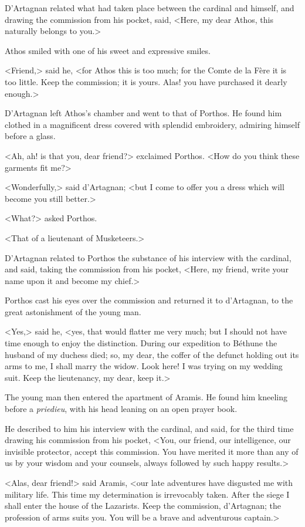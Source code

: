 D'Artagnan related what had taken place between the cardinal and himself, and drawing the commission from his pocket, said, <Here, my dear Athos, this naturally belongs to you.> 

Athos smiled with one of his sweet and expressive smiles. 

<Friend,> said he, <for Athos this is too much; for the Comte de la Fère it is too little. Keep the commission; it is yours. Alas! you have purchased it dearly enough.> 

D'Artagnan left Athos's chamber and went to that of Porthos. He found him clothed in a magnificent dress covered with splendid embroidery, admiring himself before a glass. 

<Ah, ah! is that you, dear friend?> exclaimed Porthos. <How do you think these garments fit me?> 

<Wonderfully,> said d'Artagnan; <but I come to offer you a dress which will become you still better.> 

<What?> asked Porthos. 

<That of a lieutenant of Musketeers.> 

D'Artagnan related to Porthos the substance of his interview with the cardinal, and said, taking the commission from his pocket, <Here, my friend, write your name upon it and become my chief.> 

Porthos cast his eyes over the commission and returned it to d'Artagnan, to the great astonishment of the young man. 

<Yes,> said he, <yes, that would flatter me very much; but I should not have time enough to enjoy the distinction. During our expedition to Béthune the husband of my duchess died; so, my dear, the coffer of the defunct holding out its arms to me, I shall marry the widow. Look here! I was trying on my wedding suit. Keep the lieutenancy, my dear, keep it.> 

The young man then entered the apartment of Aramis. He found him kneeling before a \textit{priedieu}, with his head leaning on an open prayer book. 

He described to him his interview with the cardinal, and said, for the third time drawing his commission from his pocket, <You, our friend, our intelligence, our invisible protector, accept this commission. You have merited it more than any of us by your wisdom and your counsels, always followed by such happy results.> 

<Alas, dear friend!> said Aramis, <our late adventures have disgusted me with military life. This time my determination is irrevocably taken. After the siege I shall enter the house of the Lazarists. Keep the commission, d'Artagnan; the profession of arms suits you. You will be a brave and adventurous captain.> 

